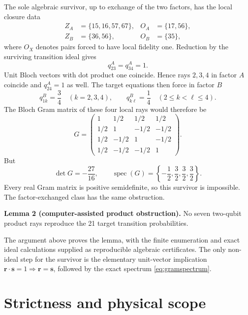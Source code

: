 \documentclass[11pt]{article}
\newcommand{\spec}{\operatorname{spec}}
\begin{document}
The sole algebraic survivor, up to exchange of the two factors, has the local
closure data
\begin{align}
 Z_A&=\{15,16,57,67\}, & O_A&=\{17,56\},\nonumber\\
 Z_B&=\{36,56\},       & O_B&=\{35\},                    \label{eq:survivor}
\end{align}
where $O_X$ denotes pairs forced to have local fidelity one.  Reduction by the
surviving transition ideal gives
\begin{equation}
 q^A_{23}=q^A_{34}=1.                                    \label{eq:forcedone}
\end{equation}
Unit Bloch vectors with dot product one coincide.  Hence rays $2,3,4$ in
factor $A$ coincide and $q^A_{24}=1$ as well.  The target equations then force
in factor $B$
\begin{equation}
 q^B_{1k}=\frac34\quad(k=2,3,4),\qquad
 q^B_{k\ell}=\frac14\quad(2\leq k<\ell\leq4).            \label{eq:forcedq}
\end{equation}
The Bloch Gram matrix of these four local rays would therefore be
\begin{equation}
 G=\begin{pmatrix}
 1&1/2&1/2&1/2\\
 1/2&1&-1/2&-1/2\\
 1/2&-1/2&1&-1/2\\
 1/2&-1/2&-1/2&1
 \end{pmatrix}.                                          \label{eq:gram}
\end{equation}
But
\begin{equation}
 \det G=-\frac{27}{16},\qquad
 \spec(G)=\left\{-\frac12,\frac32,\frac32,\frac32\right\}. \label{eq:gramspectrum}
\end{equation}
Every real Gram matrix is positive semidefinite, so this survivor is
impossible.  The factor-exchanged class has the same obstruction.

\textbf{Lemma 2 (computer-assisted product obstruction).}
No seven two-qubit product rays reproduce the 21 target transition
probabilities.

The argument above proves the lemma, with the finite enumeration and exact
ideal calculations supplied as reproducible algebraic certificates.  The only
non-ideal step for the survivor is the elementary unit-vector implication
$\boldsymbol r\cdot\boldsymbol s=1\Rightarrow\boldsymbol r=\boldsymbol s$,
followed by the exact spectrum \eqref{eq:gramspectrum}.

\section{Strictness and physical scope}
\label{sec:strictness}
\end{document}

